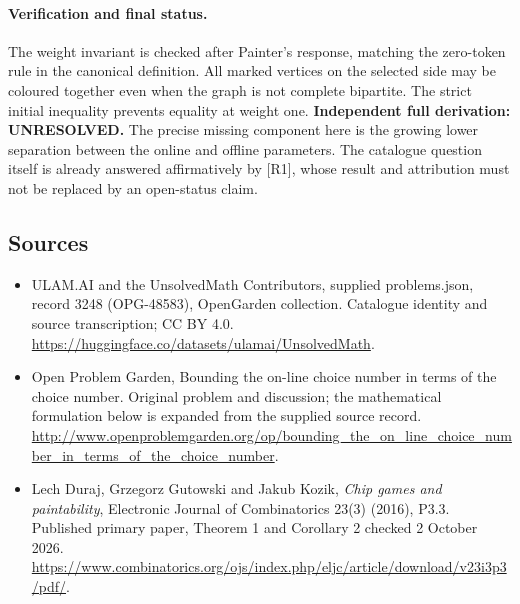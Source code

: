 \documentclass[11pt,a4paper]{article}
\begin{document}
\paragraph{Verification and final status.}
The weight invariant is checked after Painter's response, matching the
zero-token rule in the canonical definition. All marked vertices on
the selected side may be coloured together even when the graph is
not complete bipartite. The strict initial inequality prevents equality
at weight one. \textbf{Independent full derivation: UNRESOLVED.}
The precise missing component here is the growing lower separation
between the online and offline parameters. The catalogue question
itself is already answered affirmatively by [R1], whose result and
attribution must not be replaced by an open-status claim.

\subsection{Sources}
\begin{itemize}
\item[S1] ULAM.AI and the UnsolvedMath Contributors, supplied problems.json, record 3248 (OPG-48583), OpenGarden collection. Catalogue identity and source transcription; CC BY 4.0.
\url{https://huggingface.co/datasets/ulamai/UnsolvedMath}.
\item[S2] Open Problem Garden, Bounding the on-line choice number in terms of the choice number. Original problem and discussion; the mathematical formulation below is expanded from the supplied source record.
\url{http://www.openproblemgarden.org/op/bounding_the_on_line_choice_number_in_terms_of_the_choice_number}.

\item[R1] Lech Duraj, Grzegorz Gutowski and Jakub Kozik,
\emph{Chip games and paintability}, Electronic Journal of Combinatorics
23(3) (2016), P3.3. Published primary paper, Theorem 1 and Corollary 2
checked 2 October 2026.
\url{https://www.combinatorics.org/ojs/index.php/eljc/article/download/v23i3p3/pdf/}.

\end{itemize}
\end{document}
